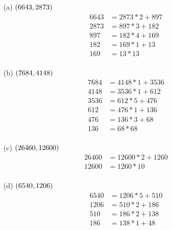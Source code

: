 \begin{mdframed}[style=darkAnswer,frametitle={Joe Starr}]
  \begin{multicols}{2}
    \begin{itemize}
      \item [(a)] {$\left(6643,2873\right)$
            \begin{align*}
              6643 & =2873*2+897 \\
              2873 & =897*3+182  \\
              897  & =182*4+169  \\
              182  & =169*1+13   \\
              169  & =13*13      \\
            \end{align*}
            }
      \item [(b)] {$\left(7684,4148\right)$
            \begin{align*}
              7684 & =4148*1+3536 \\
              4148 & =3536*1+612  \\
              3536 & =612*5+476   \\
              612  & =476*1+136   \\
              476  & =136*3+68    \\
              136  & =68*68       \\
            \end{align*}
            }
      \item [(c)] {$\left(26460,12600\right)$
            \begin{align*}
              26460 & =12600*2+1260 \\
              12600 & =1260*10      \\
            \end{align*}
            }
    \end{itemize}
  \end{multicols}
  \begin{multicols}{2}
    \begin{itemize}
      \item [(d)] {$\left(6540,1206\right)$
            \begin{align*}
              6540 & =1206*5+510 \\
              1206 & =510*2+186  \\
              510  & =186*2+138  \\
              186  & =138*1+48   \\

\end{align*}}
\end{itemize}
\end{multicols}
\end{mdframed}
